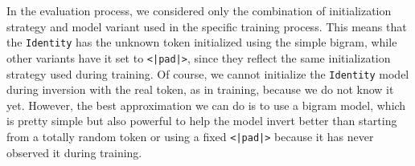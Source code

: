 \documentclass[../thesis.tex]{subfiles}
\begin{document}
\noindent
In the evaluation process, we considered only the combination of initialization strategy and model variant used in the specific training process. This means that the \texttt{Identity} has the unknown token initialized using the simple bigram, while other variants have it set to \texttt{<|pad|>}, since they reflect the same initialization strategy used during training. Of course, we cannot initialize the \texttt{Identity} model during inversion with the real token, as in training, because we do not know it yet. However, the best approximation we can do is to use a bigram model, which is pretty simple but also powerful to help the model invert better than starting from a totally random token or using a fixed \texttt{<|pad|>} because it has never observed it during training.


\end{document}
